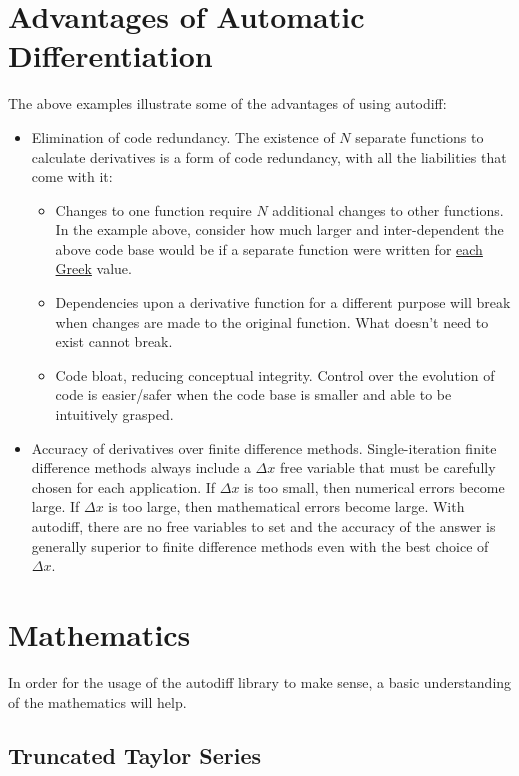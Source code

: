 \documentclass{article}
\begin{document}
\section{Advantages of Automatic Differentiation}
The above examples illustrate some of the advantages of using autodiff:
\begin{itemize}
\item Elimination of code redundancy. The existence of $N$ separate functions to calculate derivatives is a form
  of code redundancy, with all the liabilities that come with it:
  \begin{itemize}
    \item Changes to one function require $N$ additional changes to other functions. In the  example above,
        consider how much larger and inter-dependent the above code base would be if a separate function were
        written for \href{https://en.wikipedia.org/wiki/Greeks\_(finance)#Formulas\_for\_European\_option\_Greeks}
        {each Greek} value.
    \item Dependencies upon a derivative function for a different purpose will break when changes are made to
        the original function. What doesn't need to exist cannot break.
    \item Code bloat, reducing conceptual integrity. Control over the evolution of code is easier/safer when
        the code base is smaller and able to be intuitively grasped.
  \end{itemize}
\item Accuracy of derivatives over finite difference methods. Single-iteration finite difference methods always
   include a $\Delta x$ free variable that must be carefully chosen for each application. If $\Delta x$ is too
   small, then numerical errors become large. If $\Delta x$ is too large, then mathematical errors become large.
   With autodiff, there are no free variables to set and the accuracy of the answer is generally superior to finite
   difference methods even with the best choice of $\Delta x$.
\end{itemize}

\section{Mathematics}

In order for the usage of the autodiff library to make sense, a basic understanding of the mathematics will help.

\subsection{Truncated Taylor Series}
\end{document}
